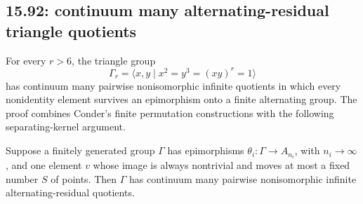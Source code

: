 \subsection{15.92: continuum many alternating-residual triangle quotients}
\label{cand:15.92}
For every \(r>6\), the triangle group
\[
 \Gamma_r=\langle x,y\mid x^2=y^3=(xy)^r=1\rangle
\]
has continuum many pairwise nonisomorphic infinite quotients in which
every nonidentity element survives an epimorphism onto a finite
alternating group. The proof combines Conder's finite permutation
constructions with the following separating-kernel argument.

\begin{lemma}
Suppose a finitely generated group \(\Gamma\) has epimorphisms
\(\theta_i:\Gamma\to A_{n_i}\), with \(n_i\to\infty\), and one
element \(v\) whose image is always nontrivial and moves at most
a fixed number \(S\) of points. Then \(\Gamma\) has continuum many
pairwise nonisomorphic infinite alternating-residual quotients.
\end{lemma}
